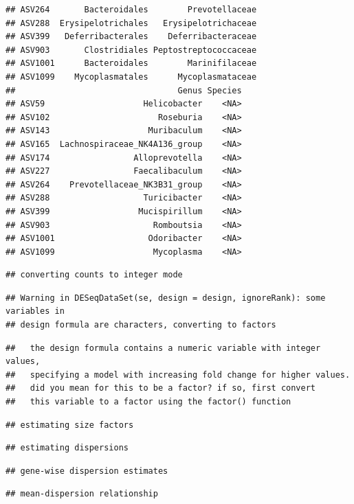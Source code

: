 \documentclass[]{article}
\begin{document}
\begin{verbatim}
## ASV264       Bacteroidales        Prevotellaceae
## ASV288  Erysipelotrichales   Erysipelotrichaceae
## ASV399   Deferribacterales    Deferribacteraceae
## ASV903       Clostridiales Peptostreptococcaceae
## ASV1001      Bacteroidales        Marinifilaceae
## ASV1099    Mycoplasmatales      Mycoplasmataceae
##                                 Genus Species
## ASV59                    Helicobacter    <NA>
## ASV102                      Roseburia    <NA>
## ASV143                    Muribaculum    <NA>
## ASV165  Lachnospiraceae_NK4A136_group    <NA>
## ASV174                 Alloprevotella    <NA>
## ASV227                 Faecalibaculum    <NA>
## ASV264    Prevotellaceae_NK3B31_group    <NA>
## ASV288                   Turicibacter    <NA>
## ASV399                  Mucispirillum    <NA>
## ASV903                     Romboutsia    <NA>
## ASV1001                   Odoribacter    <NA>
## ASV1099                    Mycoplasma    <NA>
\end{verbatim}

\begin{verbatim}
## converting counts to integer mode
\end{verbatim}

\begin{verbatim}
## Warning in DESeqDataSet(se, design = design, ignoreRank): some variables in
## design formula are characters, converting to factors
\end{verbatim}

\begin{verbatim}
##   the design formula contains a numeric variable with integer values,
##   specifying a model with increasing fold change for higher values.
##   did you mean for this to be a factor? if so, first convert
##   this variable to a factor using the factor() function
\end{verbatim}

\begin{verbatim}
## estimating size factors
\end{verbatim}

\begin{verbatim}
## estimating dispersions
\end{verbatim}

\begin{verbatim}
## gene-wise dispersion estimates
\end{verbatim}

\begin{verbatim}
## mean-dispersion relationship
\end{verbatim}
\end{document}
